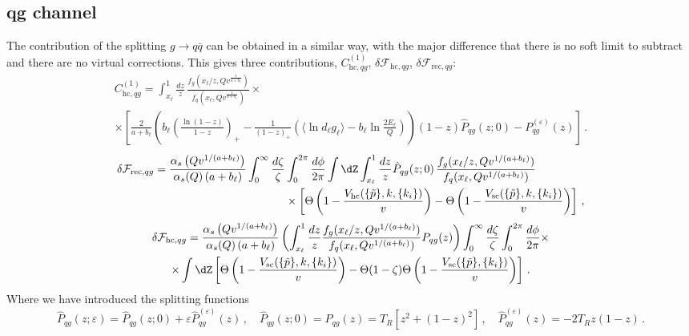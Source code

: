 \subsection{qg channel}
The contribution of the splitting $g\to q\bar q$ can be obtained in a
similar way, with the major difference that there is no soft limit to
subtract and there are no virtual corrections.
This gives three contributions, $C_{\mathrm{hc},qg}^{(1)}$, $\delta\mathcal{F}_{\mathrm{hc},qg}$, $\delta\mathcal{F}_{\mathrm{rec},qg}$:
  \begin{multline}
    \label{eq:C1qg-final}
C^{(1)}_{\mathrm{hc}, qg}=  \int_{x_\ell}^1\frac{dz}{z}\,\frac{f_g(x_\ell/z,Qv^{\frac{1}{a+b_\ell}})}{f_q(x_\ell,Qv^{\frac{1}{a+b_\ell}})}\times \\ \times
\left[\frac{2 }{a+b_\ell}\left(b_\ell\left(\frac{\ln(1-z)}{1-z}\right)_+-\frac{1}{(1-z)_+}
        \left(\langle\ln d_\ell g_\ell\rangle-b_\ell \ln\frac{2E_\ell}{Q}\right)\right)(1-z)\hat P_{qg}(z;0)-P_{qg}^{(\varepsilon)}(z)\right]\,.
  \end{multline}
\begin{equation}
\label{eq:dFrec-qg}
\begin{aligned}
\delta \mathcal{F}_{\mathrm{rec},qg} = \frac{\alpha_s\left(Q v^{1/(a+b_\ell)}\right)}{\alpha_s(Q)\left(a+b_\ell\right)}\int_0^\infty\frac{d\zeta}{\zeta} &\int_0^{2\pi}\frac{d\phi}{2\pi}\int \dZ\int_{x_\ell}^1 \frac{dz}{z} \hat P_{qg}(z;0)\,\frac{f_g(x_\ell/z,Qv^{1/(a+b_\ell)})}{f_q(x_\ell,Qv^{1/(a+b_\ell)})} \\
&\times  
\left[\Theta\left(1-\frac{V_{\mathrm{hc}}(\{\tilde{p}\},k,\{k_i\})}{v}\right)-\Theta\left(1-\frac{V_{\mathrm{sc}}(\{\tilde{p}\},k,\{k_i\})}{v}\right)\right]\,,
\end{aligned}
\end{equation}
\begin{multline}
\label{eq:dFhc-qg}
\delta \mathcal{F}_{\mathrm{hc},qg} = \frac{\alpha_s\left(Qv^{1/(a+b_\ell)}\right)}{\alpha_s(Q)\left(a+b_\ell\right)}\left(\int_{x_\ell}^1 \frac{dz}{z}\frac{f_g(x_\ell/z,Qv^{1/(a+b_\ell)})}{f_q(x_\ell,Qv^{1/(a+b_\ell)})} P_{qg}(z)\right)\int_0^\infty\frac{d\zeta}{\zeta}\int_0^{2\pi}\frac{d\phi}{2\pi}\times \\
\times \int \dZ   \left[\Theta\left(1-\frac{V_{\mathrm{sc}}(\{\tilde{p}\},k,\{k_i\})}{v}\right) -\Theta(1-\zeta)\Theta\left(1-\frac{V_{\mathrm{sc}}(\{\tilde{p}\},\{k_i\})}{v}\right)\right]\,.
\end{multline}
Where we have introduced the splitting functions
\begin{equation}
  \label{eq:Pqg}
  \hat P_{qg}(z;\varepsilon) = \hat P_{qg}(z;0)+\varepsilon \hat P_{qg}^{(\varepsilon)}(z)\,,\quad
 \hat P_{qg}(z;0)= P_{qg}(z) = T_R \left[z^2+(1-z)^2\right]\,,
   \quad \hat P_{qg}^{(\varepsilon)}(z) = -2T_R z(1-z)\,.
 \end{equation}



